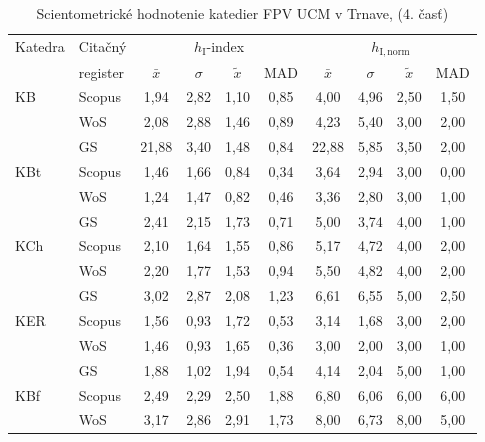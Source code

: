 \begin{table}
  \centering\small
  \caption[Hodnotenie FPV\,--\,$h_{\mathrm{I}}$-index a $h_{\mathrm{I,norm}}$]{Scientometrické hodnotenie katedier FPV UCM v Trnave, (4. časť)}
\label{tab:4-staff.results}
\begin{tabular}{llcccccccc}
  \toprule\noalign{\vspace{.3ex}}
  Katedra& Citačný & \multicolumn{4}{c}{$h_{\mathrm{I}}$-index}  & \multicolumn{4}{c}{$h_{\mathrm{I,norm}}$}  \\
      & register& $\bar{x}$      & $\sigma$  & $\tilde{x}$ & MAD  & $\bar{x}$      & $\sigma$  & $\tilde{x}$  & MAD  \\[0.3ex]
  \midrule\noalign{\vspace{.5ex}}                                                                                                                         
 KB   & Scopus & 1,94     & 2,82 & 1,10 & 0,85 & 4,00    & 4,96 & 2,50 & 1,50 \\
      & WoS    & 2,08     & 2,88 & 1,46 & 0,89 & 4,23    & 5,40 & 3,00 & 2,00 \\
      & GS     & 21,88    & 3,40 & 1,48 & 0,84 & 22,88   & 5,85 & 3,50 & 2,00 \\[1ex]
 KBt  & Scopus & 1,46     & 1,66 & 0,84 & 0,34 & 3,64    & 2,94 & 3,00 & 0,00 \\
      & WoS    & 1,24     & 1,47 & 0,82 & 0,46 & 3,36    & 2,80 & 3,00 & 1,00 \\
      & GS     & 2,41     & 2,15 & 1,73 & 0,71 & 5,00    & 3,74 & 4,00 & 1,00 \\[1ex]
 KCh  & Scopus & 2,10     & 1,64 & 1,55 & 0,86 & 5,17    & 4,72 & 4,00 & 2,00 \\
      & WoS    & 2,20     & 1,77 & 1,53 & 0,94 & 5,50    & 4,82 & 4,00 & 2,00 \\
      & GS     & 3,02     & 2,87 & 2,08 & 1,23 & 6,61    & 6,55 & 5,00 & 2,50 \\[1ex]
 KER  & Scopus & 1,56     & 0,93 & 1,72 & 0,53 & 3,14    & 1,68 & 3,00 & 2,00 \\
      & WoS    & 1,46     & 0,93 & 1,65 & 0,36 & 3,00    & 2,00 & 3,00 & 1,00 \\
      & GS     & 1,88     & 1,02 & 1,94 & 0,54 & 4,14    & 2,04 & 5,00 & 1,00 \\[1ex]
 KBf  & Scopus & 2,49     & 2,29 & 2,50 & 1,88 & 6,80    & 6,06 & 6,00 & 6,00 \\
      & WoS    & 3,17     & 2,86 & 2,91 & 1,73 & 8,00    & 6,73 & 8,00 & 5,00 \\

\end{tabular}
\end{table}
